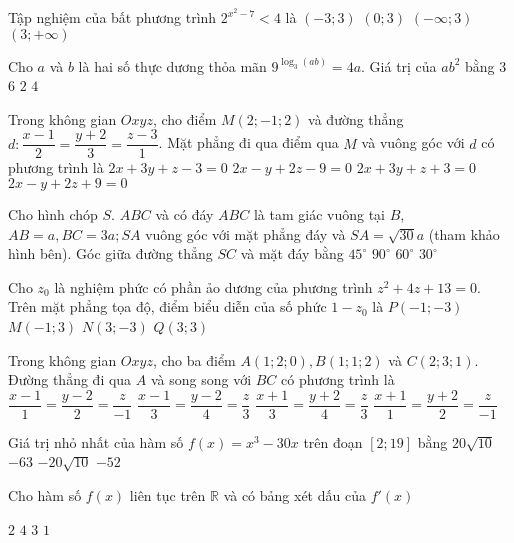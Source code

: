 \begin{ex}%
Tập nghiệm của bất phương trình $2^{x^2-7}<4$ là
\choice
{\True $(-3; 3)$}
{$(0; 3)$}
{$(-\infty; 3)$}
{$(3;+\infty)$}

\end{ex}
\begin{ex}%
Cho $a$ và $b$ là hai số thực dương thỏa mãn $9^{\log_3(a b)}=4 a$. Giá trị của $a b^2$ bằng
\choice
{$3$}
{$6$}
{$2$}
{\True $4$}

\end{ex}
\begin{ex}%
Trong không gian $O x y z$, cho điểm $M(2;-1; 2)$ và đường thẳng $d\colon \dfrac{x-1}{2}=\dfrac{y+2}{3}=\dfrac{z-3}{1}$. Mặt phẳng đi qua điểm qua $M$ và vuông góc với $d$ có phương trình là
\choice
{\True $2 x+3 y+z-3=0$}
{$2 x-y+2 z-9=0$}
{$2 x+3 y+z+3=0$}
{$2 x-y+2 z+9=0$}

\end{ex}
\begin{ex}%
Cho hình chóp $S$. $ABC$ và có đáy $ABC$ là tam giác vuông tại $B$, $AB=a, BC=3 a; SA$ vuông góc với mặt phẳng đáy và $SA=\sqrt{30} a$ (tham khảo hình bên). Góc giữa đường thẳng $SC$ và mặt đáy bằng
\choice
{$45^{\circ}$}
{$90^{\circ}$}
{\True $60^{\circ}$}
{$30^{\circ}$}

\end{ex}
\begin{ex}%
Cho $z_0$ là nghiệm phức có phần ảo dương của phương trình $z^2+ 4 z+13=0$. Trên mặt phẳng tọa độ, điểm biểu diễn của số phức $1-z_0$ là
\choice
{$P(-1;-3)$}
{$M(-1; 3)$}
{\True $N(3;-3)$}
{$Q(3; 3)$}

\end{ex}
\begin{ex}%
Trong không gian $O x y z$, cho ba điểm $A(1; 2; 0), B(1; 1; 2)$ và $C(2; 3; 1)$. Đường thẳng đi qua $A$ và song song với $BC$ có phương trình là
\choice
{\True $\dfrac{x-1}{1}=\dfrac{y-2}{2}=\dfrac{z}{-1}$}
{$\dfrac{x-1}{3}=\dfrac{y-2}{4}=\dfrac{z}{3}$}
{$\dfrac{x+1}{3}=\dfrac{y+2}{4}=\dfrac{z}{3}$}
{$\dfrac{x+1}{1}=\dfrac{y+2}{2}=\dfrac{z}{-1}$}

\end{ex}
\begin{ex}%
Giá trị nhỏ nhất của hàm số $f(x)=x^3-30 x$ trên đoạn $[2; 19]$ bằng
\choice
{$20\sqrt{10}$}
{$-63$}
{\True $-20\sqrt{10}$}
{$-52$}

\end{ex}
\begin{ex}%
Cho hàm số $f(x)$ liên tục trên $\mathbb{R}$ và có bảng xét dấu của $f'(x)$
{
}
\choice
{$2$}
{$4$}
{\True $3$}
{$1$}
\end{ex}
